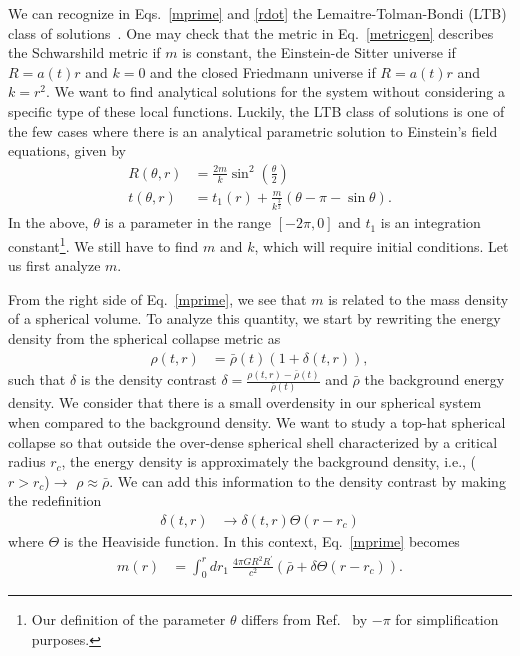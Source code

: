 \documentclass[a4paper,11pt]{article}
\begin{document}
We can recognize in Eqs.~\eqref{mprime} and \eqref{rdot} the Lemaitre-Tolman-Bondi (LTB) class of solutions~\cite{Lemaitre1933}. One may check that the metric in Eq.~\eqref{metricgen} describes the Schwarshild metric if $m$ is constant, the Einstein-de Sitter universe if $R = a(t)r$ and $k=0$ and the closed Friedmann universe if $R= a(t)r$ and $k = r^2$. We want to find analytical solutions for the system without considering a specific type of these local functions. Luckily, the LTB class of solutions is one of the few cases where there is an analytical parametric solution to Einstein's field equations, given by
\begin{align}
	\label{ltb1}
	R(\theta, r) &= \frac{2m}{k}\sin^2\left(\frac{\theta}{2}\right )\\
	\label{ltb2}
	t(\theta, r) &= t_1(r) + \frac{m}{k^{\frac{3}{2}}}\left(\theta - \pi - \sin\theta\right)
	.\end{align}
In the above, $\theta$ is a parameter in the range $[-2\pi, 0]$ and $t_1$ is an integration constant\footnote{Our definition of the parameter $\theta$ differs from Ref.~\cite{Martin2020} by $-\pi$ for simplification purposes.}. We still have to find $m$ and $k$, which will require initial conditions. Let us first analyze $m$.

From the right side of Eq.~\eqref{mprime}, we see that $m$ is related to the mass density of a spherical volume. To analyze this quantity, we start by rewriting the energy density from the spherical collapse metric as 
\begin{align}
	\rho(t, r) &= \bar{\rho}(t)(1 + \delta(t,r))
	,\end{align}
such that $\delta$ is the density contrast $\delta = \frac{\rho(t,r) - \bar{\rho}(t)}{\bar{\rho}(t)}$ and $\bar{\rho}$ the background energy density.  We consider that there is a small overdensity in our spherical system when compared to the background density. We want to study a top-hat spherical collapse so that outside the over-dense spherical shell characterized by a critical radius $r_c$, the energy density is approximately the background density, i.e., ($r > r_c$)$\rightarrow$ $\rho \approx \bar{\rho}$. We can add this information to the density contrast by making the redefinition
\begin{align}
	\delta(t, r) &\rightarrow \delta(t, r) \Theta(r-r_c)
\end{align}
where $\Theta$ is the Heaviside function. In this context, Eq.~\eqref{mprime} becomes
\begin{align}
	m(r) &= \int_0^r dr_1~ \frac{4\pi GR^2R^\prime}{c^2} \left(\bar{\rho} + \delta \Theta(r-r_c)\right)
	.\end{align}
\end{document}
